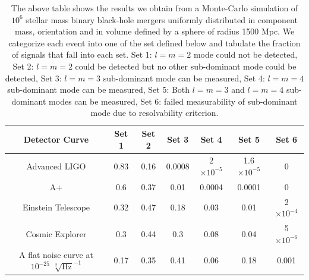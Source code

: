 \begin{table}[h!]
\centering
\begin{tabular}{||c c c c c c c||} 
 \hline
 Detector Curve & Set 1 & Set 2 & Set 3 & Set 4 & Set 5 & Set 6 \\ [0.5ex] 
 \hline\hline
 Advanced LIGO & 0.83 & 0.16 & 0.0008 &2 $\times 10^{-5}$ &1.6 $\times 10^{-5}$ &0\\ 
 A+ & 0.6 & 0.37 & 0.01 & 0.0004 &0.0001 &0\\
 Einstein Telescope & 0.32 & 0.47 & 0.18 &0.03 & 0.01 & 2 $\times 10^{-4}$\\
 Cosmic Explorer & 0.3 & 0.44 & 0.3 &0.08 & 0.04 &5 $\times 10^{-6}$\\
 A flat noise curve at $10^{-25}$ $\sqrt[2]{\mathrm{Hz}}^{-1}$ & 0.17 & 0.35 & 0.41 & 0.06 & 0.18 &0.001 \\ [1ex] 
 \hline
\end{tabular}
\caption{The above table shows the results we obtain from a Monte-Carlo simulation of $10^{6}$ stellar mass binary black-hole mergers uniformly distributed in component mass, orientation and in volume defined by a sphere of radius 1500 Mpc. We categorize each event into one of the set defined below and tabulate the fraction of signals that fall into each set. Set 1: $l=m=2$ mode could not be detected, Set 2: $l=m=2$ could be detected but no other sub-dominant mode could be detected, Set 3: $l=m=3$ sub-dominant mode can be measured, Set 4: $l=m=4$ sub-dominant mode can be measured, Set 5: Both $l=m=3$ and $l=m=4$ sub-dominant modes can be measured, Set 6: failed measurability of sub-dominant mode due to resolvability criterion.}
\label{table:1}
\end{table}



